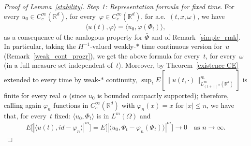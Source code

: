 \documentclass[a4paper,10pt]{article}
\newcommand\1{\mathbbm{1}}
\newcommand{\mr}{\mathbb{R}}
\newcommand{\lan}{\langle}
\newcommand{\ran}{\rangle}
\numberwithin{equation}{section}
\begin{document}
\begin{proof}[Proof of Lemma~\ref{stability}]
\emph{Step 1: Representation formula for fixed time}. For every $u_0 \in C^\infty_c(\mr^d)$, for every~$\varphi \in C^\infty_c(\mr^d)$, for a.e.~$(t,x,\omega)$, we have
\begin{align}
\lan u(t),\varphi\ran = \lan u_0,\varphi(\Phi_t)\ran,\label{repr_formula_CE}
\end{align}
as a consequence of the analogous property for $\bar{\Phi}$ and of Remark~\ref{simple_rmk}. In particular, taking the $H^{-1}$-valued weakly-$*$ time continuous version for~$u$ (Remark~\ref{weak_cont_progr}), we get the above formula for every~$t$, for every~$\omega$ (in a full measure set independent of~$t$). Moreover, by Theorem~\ref{existence CE} extended to every time by weak-$*$ continuity, $\sup_t E[\|u(t,\cdot)\|_{L^m_{(1+|\cdot|)^\alpha}(\mr^d)}^m]$ is finite for every real $\alpha$ (since $u_0$ is bounded compactly supported); therefore, calling again $\varphi_n$ functions in $C^\infty_c(\mr^d)$ with $\varphi_n(x)=x$ for $|x|\le n$, we have that, for every~$t$ fixed: $\lan u_0,\Phi_t\ran$ is in $L^m(\Omega)$ and 
\begin{align*}
E\big[\left| \lan u(t),id-\varphi_n\ran \right|^m\big] = E\big[\left|\lan u_0,\Phi_t-\varphi_n(\Phi_t)\ran \right|^m\big] \rightarrow 0 \quad \text{as } n \to \infty.
\end{align*}


\end{proof}
\end{document}
